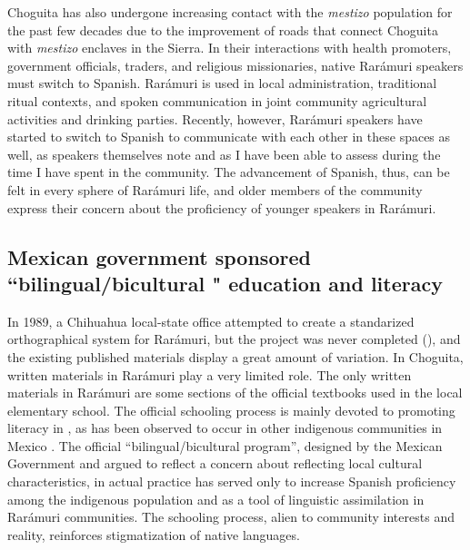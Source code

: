 Choguita has also undergone increasing contact with the \textit{mestizo} population for the past few decades due to the improvement of roads that connect Choguita with \textit{mestizo} enclaves in the Sierra. In their interactions with health promoters, government officials, traders, and religious missionaries, native Rarámuri speakers must switch to {Spanish}. Rarámuri is used in local administration, traditional ritual contexts, and spoken communication in joint community agricultural activities and drinking parties. Recently, however, Rarámuri speakers have started to switch to {Spanish} to communicate with each other in these spaces as well, as speakers themselves note and as I have been able to assess during the time I have spent in the community. The advancement of {Spanish}, thus, can be felt in every sphere of Rarámuri life, and older members of the community express their concern about the proficiency of younger speakers in Rarámuri.




\subsection{Mexican government sponsored ``bilingual/bicultural
" education and literacy}
\label{subsec: literacy}

In 1989, a Chihuahua local-state office attempted to create a standarized orthographical system for Rarámuri, but the project was never completed (\citealt{pintado2004tarahumaras}), and the existing published materials display a great amount of variation. In Choguita, written materials in Rarámuri play a very limited role. The only written materials in Rarámuri are some sections of the official textbooks used in the local elementary school. The official schooling process is mainly devoted to promoting literacy in , as has been observed to occur in other indigenous communities in Mexico \parencite{lastra2001otomi}. The official “bilingual/bicultural program”, designed by the Mexican Government and argued to reflect a concern about  reflecting local cultural characteristics, in actual practice has served only to increase {Spanish} proficiency among the indigenous population and as a tool of linguistic assimilation in Rarámuri communities. The schooling process, alien to community interests and reality, reinforces stigmatization of native languages.

